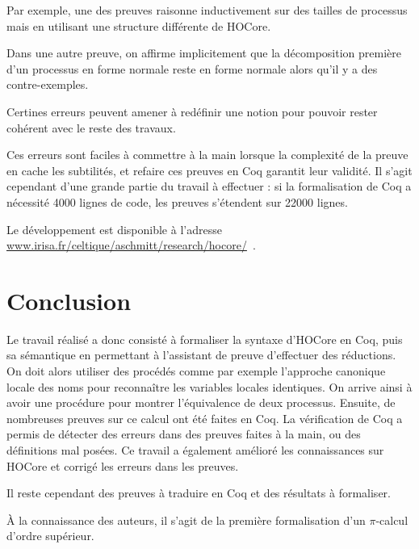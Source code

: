 \documentclass[11pt]{article}
\def\pic{$\pi$-calcul }
\begin{document}
Par exemple, une des preuves raisonne inductivement sur des tailles de processus mais en utilisant une structure différente de HOCore.

Dans une autre preuve, on affirme implicitement que la décomposition première d'un processus en forme normale reste en forme normale alors qu'il y a des contre-exemples.

Certines erreurs peuvent amener à redéfinir une notion pour pouvoir rester cohérent avec le reste des travaux.

Ces erreurs sont faciles à commettre à la main lorsque la complexité de la preuve en cache les subtilités, et refaire ces preuves en Coq garantit leur validité. Il s'agit cependant d'une grande partie du travail à effectuer : si la formalisation de Coq a nécessité 4000 lignes de code, les preuves s'étendent sur 22000 lignes. 

Le développement est disponible à l'adresse \url{www.irisa.fr/celtique/aschmitt/research/hocore/}\ .

\section{Conclusion}
Le travail réalisé a donc consisté à formaliser la syntaxe d'HOCore en Coq, puis sa sémantique en permettant à l'assistant de preuve d'effectuer des réductions. 
On doit alors utiliser des procédés comme par exemple l'approche canonique locale des noms pour reconnaître les variables locales identiques.
On arrive ainsi à avoir une procédure pour montrer l'équivalence de deux processus. %
Ensuite, de nombreuses preuves sur ce calcul ont été faites en Coq. La vérification de Coq a permis de détecter des erreurs dans des preuves faites à la main, ou des définitions mal posées. Ce travail a également amélioré les connaissances sur HOCore et corrigé les erreurs dans les preuves.

Il reste cependant des preuves à traduire en Coq et des résultats à formaliser. %

À la connaissance des auteurs, il s'agit de la première formalisation d'un \pic d'ordre supérieur. 



\end{document}
